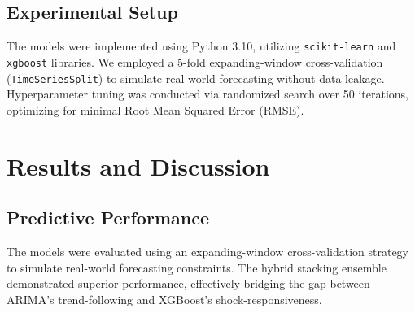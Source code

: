 \documentclass[conference]{IEEEtran}
\begin{document}
\subsection{Experimental Setup}
The models were implemented using Python 3.10, utilizing \texttt{scikit-learn} and \texttt{xgboost} libraries. We employed a 5-fold expanding-window cross-validation (\texttt{TimeSeriesSplit}) to simulate real-world forecasting without data leakage. Hyperparameter tuning was conducted via randomized search over 50 iterations, optimizing for minimal Root Mean Squared Error (RMSE).

\section{Results and Discussion}
\label{sec:results}

\subsection{Predictive Performance}
The models were evaluated using an expanding-window cross-validation strategy to simulate real-world forecasting constraints. The hybrid stacking ensemble demonstrated superior performance, effectively bridging the gap between ARIMA's trend-following and XGBoost's shock-responsiveness. 

\begin{table}[htbp]
\centering
\caption{Global Model Performance Comparison (5-Fold TimeSeries CV)}
\label{tab:model_comp}
\end{table}
\end{document}
